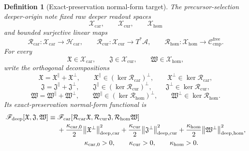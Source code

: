 \documentclass[11pt]{article}
\newcommand{\Sub}{\mathcal A}
\newcommand{\CompFree}{\mathscr C_{\mathrm{cmp}}^{\mathrm{free}}}
\newcommand{\CarrierFunctional}{\mathscr F_{\mathrm{car}}}
\newcommand{\DeepFunctional}{\mathscr F_{\mathrm{deep}}}
\newcommand{\CarrierClass}{\mathscr H_{\mathrm{car}}}
\newcommand{\PreCarGap}{\kappa_{\mathrm{car},0}}
\newcommand{\CurrentGap}{\kappa_{\mathrm{cur}}}
\newcommand{\HomGap}{\kappa_{\mathrm{hom}}}
\newcommand{\DeepTensorClass}{\mathscr X_{\mathrm{car}}}
\newcommand{\DeepRelabelClass}{\mathscr X_{\mathrm{cur}}}
\newcommand{\DeepFreeClass}{\mathscr X_{\mathrm{hom}}}
\newcommand{\DeepTensor}{\mathfrak X}
\newcommand{\DeepRelabel}{\mathfrak J}
\newcommand{\DeepFree}{\mathfrak W}
\newcommand{\CarRead}{\mathcal R_{\mathrm{car}}}
\newcommand{\CurRead}{\mathcal R_{\mathrm{cur}}}
\newcommand{\HomRead}{\mathcal R_{\mathrm{hom}}}
\newtheorem{definition}{Definition}
\begin{document}
\begin{definition}[Exact-preservation normal-form target]
\label{def:deep}
The precursor-selection deeper-origin note fixed raw deeper readout spaces
\[
\DeepTensorClass,\qquad
\DeepRelabelClass,\qquad
\DeepFreeClass
\]
and bounded surjective linear maps
\begin{equation}
\CarRead:\DeepTensorClass\to\CarrierClass,
\qquad
\CurRead:\DeepRelabelClass\to T^*\Sub,
\qquad
\HomRead:\DeepFreeClass\to\CompFree.
\label{eq:maps}
\end{equation}
For every
\[
\DeepTensor\in\DeepTensorClass,\qquad
\DeepRelabel\in\DeepRelabelClass,\qquad
\DeepFree\in\DeepFreeClass,
\]
write the orthogonal decompositions
\begin{equation}
\DeepTensor=\DeepTensor^{\parallel}+\DeepTensor^{\perp},
\qquad
\DeepTensor^{\parallel}\in(\ker\CarRead)^\perp,
\qquad
\DeepTensor^{\perp}\in\ker\CarRead,
\label{eq:Xsplit}
\end{equation}
\begin{equation}
\DeepRelabel=\DeepRelabel^{\parallel}+\DeepRelabel^{\perp},
\qquad
\DeepRelabel^{\parallel}\in(\ker\CurRead)^\perp,
\qquad
\DeepRelabel^{\perp}\in\ker\CurRead,
\label{eq:Jsplit}
\end{equation}
\begin{equation}
\DeepFree=\DeepFree^{\parallel}+\DeepFree^{\perp},
\qquad
\DeepFree^{\parallel}\in(\ker\HomRead)^\perp,
\qquad
\DeepFree^{\perp}\in\ker\HomRead.
\label{eq:Wsplit}
\end{equation}
Its exact-preservation normal-form functional is
\begin{equation}
\begin{aligned}
\DeepFunctional[\DeepTensor,\DeepRelabel,\DeepFree]
\equiv\;
&\CarrierFunctional[\CarRead\DeepTensor,\CurRead\DeepRelabel,\HomRead\DeepFree]
\\
&+\frac{\PreCarGap}{2}\norm{\DeepTensor^{\perp}}_{\mathrm{deep,car}}^2
+\frac{\CurrentGap}{2}\norm{\DeepRelabel^{\perp}}_{\mathrm{deep,cur}}^2
+\frac{\HomGap}{2}\norm{\DeepFree^{\perp}}_{\mathrm{deep,hom}}^2,
\\
&\qquad\qquad
\PreCarGap>0,\qquad
\CurrentGap>0,\qquad
\HomGap>0.
\end{aligned}
\label{eq:Fdeep}
\end{equation}
\end{definition}
\end{document}
